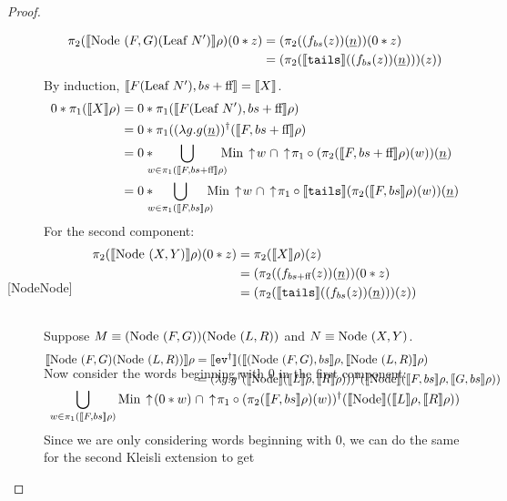 \begin{proof}
\begin{description}
\begin{align*}
\pi_2 (|[\textrm{Node }(F,G)(\textrm{Leaf } N')|]\rho) (0*z) &= 
(\pi_2((f_{bs}(z))(\underline{n}))(0*z) \\
&= (\pi_2(|[\texttt{tails}|]((f_{bs}(z))(\underline{n})))(z))
\end{align*}
By induction, $|[F(\textrm{Leaf } N'), bs+\textrm{ff }\!\!|] = |[X|]$. \vspace{-3 mm}
\begin{align*}
0*\pi_1(|[X|]\rho) &= 0*\pi_1(|[F(\Leaf N'),bs+\false\!\!|]\rho) \\
&= 0* \pi_1((\lambda g.g(\underline{n}))^{\dagger}
(|[F,bs+\false\!\!|]\rho) \\
&= 0*\!\!\!\!\bigcup_{w\in\pi_1(|[F,bs+\false\!\!|]\rho)}\!\!\!\!
\Min \ua w \;\cap 
\ua \pi_1\circ (\pi_2(|[F,bs+\false\!\!|]\rho)(w))(\underline{n}) \\
&= 0*\!\!\!\!\bigcup_{w\in\pi_1(|[F,bs|]\rho)}\!\!\!\!
\Min \ua w \;\cap 
\ua \pi_1\circ |[\texttt{tails}|](\pi_2(|[F,bs|]\rho)(w))(\underline{n}) 
\end{align*}
For the second component:\vspace{-3 mm}
\begin{align*}
\pi_2 (|[\textrm{Node }(X,Y)|]\rho) (0*z) &=
\pi_2 (|[X|]\rho) (z) \\
&= (\pi_2((f_{bs+\textrm{ff }\!\!}(z))(\underline{n}))(0*z) \\
&= (\pi_2(|[\texttt{tails}|]((f_{bs}(z))(\underline{n})))(z))\\[-10 mm]
\end{align*}
\item[{[}NodeNode{]}] \hfill \\ 
Suppose $M\equiv (\textrm{Node }(F,G))(\textrm{Node }(L,R))$ and $N\equiv \textrm{Node }(X,Y)$.\vspace{-3 mm}
\begin{align*}
|[\textrm{Node }(F,G)(\textrm{Node }(L,R))|]\rho &= 
|[\texttt{ev}^\dagger|](|[(\textrm{Node }(F,G), bs|]\rho, 
|[\textrm{Node }(L,R)|]\rho) \\
&= (\lambda g.g^{\dagger}
(|[\textrm{Node }\!\!|](|[L|]\rho,|[R|]\rho)))^{\dagger}
(|[\textrm{Node }\!\!|](|[F,bs|]\rho, |[G,bs|]\rho))\\[-10 mm]
\end{align*}
Now consider the words beginning with $0$ in the first component:
\begin{displaymath}
\bigcup_{w\in \pi_1(|[F,bs|]\rho)} \textrm{Min} \,\uparrow\! (0*w) \;\cap 
\,\uparrow\! \pi_1\circ (\pi_2(|[F,bs|]\rho)(w))^{\dagger}
(|[\textrm{Node }\!\!|](|[L|]\rho,|[R|]\rho))
\end{displaymath}
Since we are only considering words beginning with $0$, we can do the same for the second Kleisli extension to get

\end{description}
\end{proof}
